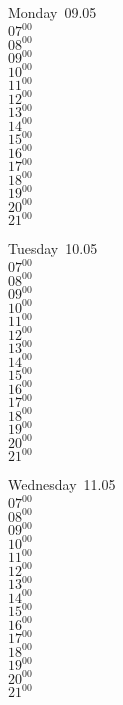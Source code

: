 \documentclass[11pt,a4paper]{book}\usepackage[]{graphicx}\usepackage[]{color}
\begin{document}
\begin{headerbox}
\end{headerbox}
\begin{weekdaybox}
  Monday~09.05\\
  { 
  \vfill
  $07^{00}$\\
$08^{00}$\\
$09^{00}$\\
$10^{00}$\\
$11^{00}$\\
$12^{00}$\\
$13^{00}$\\
$14^{00}$\\
$15^{00}$\\
$16^{00}$\\
$17^{00}$\\
$18^{00}$\\
$19^{00}$\\
$20^{00}$\\
$21^{00}$\\
  }
\end{weekdaybox}
\begin{weekdaybox}
  Tuesday~10.05\\
  { 
  \vfill
  $07^{00}$\\
$08^{00}$\\
$09^{00}$\\
$10^{00}$\\
$11^{00}$\\
$12^{00}$\\
$13^{00}$\\
$14^{00}$\\
$15^{00}$\\
$16^{00}$\\
$17^{00}$\\
$18^{00}$\\
$19^{00}$\\
$20^{00}$\\
$21^{00}$\\
  }
\end{weekdaybox}
\begin{weekdaybox}
  Wednesday~11.05\\
  { 
  \vfill
  $07^{00}$\\
$08^{00}$\\
$09^{00}$\\
$10^{00}$\\
$11^{00}$\\
$12^{00}$\\
$13^{00}$\\
$14^{00}$\\
$15^{00}$\\
$16^{00}$\\
$17^{00}$\\
$18^{00}$\\
$19^{00}$\\
$20^{00}$\\
$21^{00}$\\
  }
\end{weekdaybox}
\end{document}
